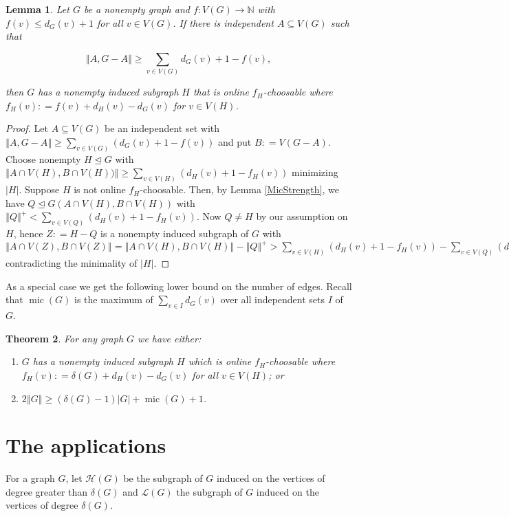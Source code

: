 \documentclass[12pt]{article}
\theoremstyle{plain}
\newtheorem{thm}{Theorem}[section]
\newtheorem{lem}[thm]{Lemma}
\theoremstyle{definition}
\theoremstyle{remark}
\newcommand{\fancy}[1]{\mathcal{#1}}
\newcommand{\IN}{\mathbb{N}}
\renewcommand{\L}{\fancy{L}}
\newcommand{\HH}{\fancy{H}}
\newcommand{\card}[1]{\left|#1\right|}
\newcommand{\size}[1]{\left\Vert#1\right\Vert}
\newcommand{\func}[3]{#1\colon #2 \rightarrow #3}
\newcommand{\parens}[1]{\left( #1 \right)}
\newcommand{\DefinedAs}{\mathrel{\mathop:}=}
\newcommand{\mic}{\operatorname{mic}}
\begin{document}
\begin{lem}\label{SecondStrengtheningMic}
Let $G$ be a nonempty graph and $\func{f}{V(G)}{\IN}$ with $f(v) \leq d_G(v) + 1$ for all $v \in V(G)$. If there is independent $A \subseteq V(G)$ such that

\[\size{A, G-A} \geq  \sum_{v \in V(G)} d_G(v) + 1 - f(v),\]

\noindent then $G$ has a nonempty induced subgraph $H$ that is online $f_H$-choosable where $f_H(v) \DefinedAs f(v) + d_H(v) - d_G(v)$ for $v \in V(H)$.
\end{lem}
\begin{proof}
Let $A \subseteq V(G)$ be an independent set with $\size{A, G-A} \geq \sum_{v \in V(G)} \parens{d_G(v) + 1 - f(v)}$ and put $B \DefinedAs V(G-A)$. Choose nonempty $H \unlhd G$ with $\size{A \cap V(H), B \cap V(H))} \geq  \sum_{v \in V(H)} \parens{d_H(v) + 1 - f_H(v)}$ minimizing $\card{H}$. Suppose $H$ is not online $f_H$-choosable. Then, by Lemma \ref{MicStrength}, we have $Q \unlhd G(A \cap V(H), B \cap V(H))$ with $\size{Q}^+ < \sum_{v \in V(Q)} \parens{d_H(v) + 1 - f_H(v)}$.  Now $Q \neq H$ by our assumption on $H$, hence $Z \DefinedAs H-Q$ is a nonempty induced subgraph of $G$ with $\size{A \cap V(Z), B \cap V(Z)} = \size{A \cap V(H), B \cap V(H)} - \size{Q}^+ > \sum_{v \in V(H)} \parens{d_H(v) + 1 - f_H(v)} - \sum_{v \in V(Q)} \parens{d_H(v) + 1 - f_H(v)} = \sum_{v \in V(Z)} \parens{d_Z(v) + 1 - f_Z(v)}$ contradicting the minimality of $\card{H}$.
\end{proof}

As a special case we get the following lower bound on the number of edges.  Recall that $\mic(G)$ is the maximum of $\sum_{v \in I} d_G(v)$ over all independent sets $I$ of $G$.

\begin{thm}\label{ConsantListMicStrength}
For any graph $G$ we have either:
\begin{enumerate}
\item $G$ has a nonempty induced subgraph $H$ which is online $f_H$-choosable where $f_H(v) \DefinedAs \delta(G) + d_H(v) - d_G(v)$ for all $v \in V(H)$; or
\item $2\size{G} \geq (\delta(G) - 1)\card{G} + \mic(G) + 1$.
\end{enumerate}
\end{thm}

\section{The applications}
For a graph $G$, let $\HH(G)$ be the subgraph of $G$ induced on the vertices of degree greater than $\delta(G)$ and $\L(G)$ the subgraph of $G$ induced on the vertices of degree $\delta(G)$.
\end{document}
